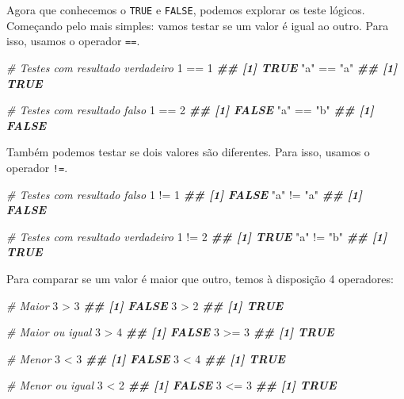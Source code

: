 \documentclass[
]{book}
\newenvironment{Shaded}{\begin{snugshade}}{\end{snugshade}}
\newcommand{\CommentTok}[1]{\textcolor[rgb]{0.56,0.35,0.01}{\textit{#1}}}
\newcommand{\DecValTok}[1]{\textcolor[rgb]{0.00,0.00,0.81}{#1}}
\newcommand{\DocumentationTok}[1]{\textcolor[rgb]{0.56,0.35,0.01}{\textbf{\textit{#1}}}}
\newcommand{\SpecialCharTok}[1]{\textcolor[rgb]{0.00,0.00,0.00}{#1}}
\newcommand{\StringTok}[1]{\textcolor[rgb]{0.31,0.60,0.02}{#1}}
\begin{document}
Agora que conhecemos o \texttt{TRUE} e \texttt{FALSE}, podemos explorar os teste lógicos. Começando pelo mais simples: vamos testar se um valor é igual ao outro. Para isso, usamos o operador \texttt{==}.

\begin{Shaded}
\begin{Highlighting}[]
\CommentTok{\# Testes com resultado verdadeiro}
\DecValTok{1} \SpecialCharTok{==} \DecValTok{1}
\DocumentationTok{\#\# [1] TRUE}
\StringTok{"a"} \SpecialCharTok{==} \StringTok{"a"}
\DocumentationTok{\#\# [1] TRUE}

\CommentTok{\# Testes com resultado falso}
\DecValTok{1} \SpecialCharTok{==} \DecValTok{2}
\DocumentationTok{\#\# [1] FALSE}
\StringTok{"a"} \SpecialCharTok{==} \StringTok{"b"}
\DocumentationTok{\#\# [1] FALSE}
\end{Highlighting}
\end{Shaded}

Também podemos testar se dois valores são diferentes. Para isso, usamos o operador \texttt{!=}.

\begin{Shaded}
\begin{Highlighting}[]
\CommentTok{\# Testes com resultado falso}
\DecValTok{1} \SpecialCharTok{!=} \DecValTok{1}
\DocumentationTok{\#\# [1] FALSE}
\StringTok{"a"} \SpecialCharTok{!=} \StringTok{"a"}
\DocumentationTok{\#\# [1] FALSE}

\CommentTok{\# Testes com resultado verdadeiro}
\DecValTok{1} \SpecialCharTok{!=} \DecValTok{2}
\DocumentationTok{\#\# [1] TRUE}
\StringTok{"a"} \SpecialCharTok{!=} \StringTok{"b"}
\DocumentationTok{\#\# [1] TRUE}
\end{Highlighting}
\end{Shaded}

Para comparar se um valor é maior que outro, temos à disposição 4 operadores:

\begin{Shaded}
\begin{Highlighting}[]
\CommentTok{\# Maior}
\DecValTok{3} \SpecialCharTok{\textgreater{}} \DecValTok{3}
\DocumentationTok{\#\# [1] FALSE}
\DecValTok{3} \SpecialCharTok{\textgreater{}} \DecValTok{2}
\DocumentationTok{\#\# [1] TRUE}

\CommentTok{\# Maior ou igual}
\DecValTok{3} \SpecialCharTok{\textgreater{}} \DecValTok{4}
\DocumentationTok{\#\# [1] FALSE}
\DecValTok{3} \SpecialCharTok{\textgreater{}=} \DecValTok{3}
\DocumentationTok{\#\# [1] TRUE}

\CommentTok{\# Menor }
\DecValTok{3} \SpecialCharTok{\textless{}} \DecValTok{3}
\DocumentationTok{\#\# [1] FALSE}
\DecValTok{3} \SpecialCharTok{\textless{}} \DecValTok{4}
\DocumentationTok{\#\# [1] TRUE}

\CommentTok{\# Menor ou igual}
\DecValTok{3} \SpecialCharTok{\textless{}} \DecValTok{2}
\DocumentationTok{\#\# [1] FALSE}
\DecValTok{3} \SpecialCharTok{\textless{}=} \DecValTok{3}
\DocumentationTok{\#\# [1] TRUE}
\end{Highlighting}
\end{Shaded}
\end{document}

